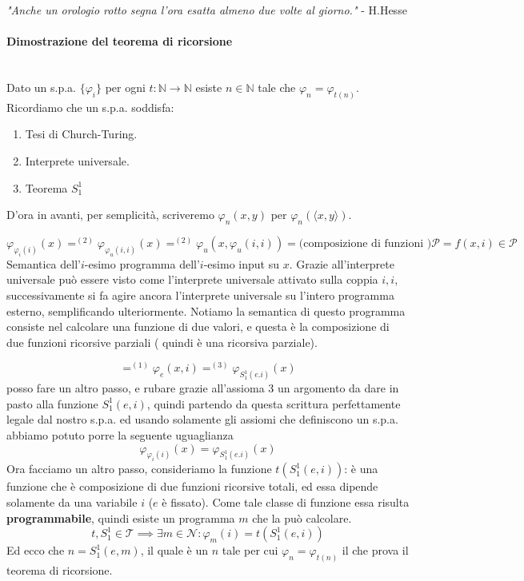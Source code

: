 \documentclass{article}
\begin{document}
\begin{center}
    \textit{"Anche un orologio rotto segna l'ora esatta almeno due volte al giorno."} - H.Hesse
\end{center}

\paragraph{Dimostrazione del teorema di ricorsione}\mbox{}\\
Dato un s.p.a. $\{\varphi_i\}$ per ogni $t:\mathbb{N}\rightarrow\mathbb{N}$ esiste
$n\in\mathbb{N}$ tale che $\varphi_n=\varphi_{t(n)}$.
Ricordiamo che un s.p.a. soddisfa:
\begin{enumerate}
    \item Tesi di Church-Turing.
    \item Interprete universale.
    \item Teorema $S_1^1$
\end{enumerate}
D'ora in avanti, per semplicità, scriveremo $\varphi_n(x,y)$ per $\varphi_n(\langle x,y\rangle)$.

$$\varphi_{\varphi_i(i)}(x)=^{(2)}\varphi_{\varphi_u (i,i)}(x)=^{(2)}\varphi_u(x,\varphi_u(i,i))=\text{(composizione di funzioni )}\mathcal{P}=f(x,i)\in\mathcal{P}$$
Semantica dell'$i$-esimo programma dell'$i$-esimo input su $x$. Grazie all'interprete
universale può essere visto come l'interprete universale attivato sulla coppia $i,i$,
successivamente si fa agire ancora l'interprete universale su l'intero programma esterno,
semplificando ulteriormente. Notiamo la semantica di questo programma consiste nel calcolare
una funzione di due valori, e questa è la composizione di due funzioni ricorsive parziali (
quindi è una ricorsiva parziale).

$$=^{(1)}\varphi_e(x,i)=^{(3)}\varphi_{S_1^1(e.i)}(x)$$
posso fare un altro passo, e rubare grazie all'assioma 3 un argomento da dare in pasto alla funzione
$S_1^1(e,i)$, quindi partendo da questa scrittura perfettamente legale dal nostro s.p.a. ed
usando solamente gli assiomi che definiscono un s.p.a. abbiamo potuto porre la seguente uguaglianza
$$\varphi_{\varphi_i(i)}(x)=\varphi_{S_1^1(e.i)}(x)$$
Ora facciamo un altro passo, consideriamo la funzione $t(S_1^1(e,i))$: è una funzione
che è composizione di due funzioni ricorsive totali, ed essa dipende solamente da una variabile
$i$ ($e$ è fissato). Come tale classe di funzione essa risulta \textbf{programmabile}, quindi
esiste un programma $m$ che la può calcolare.
$$t,S_1^1\in\mathcal{T}\implies\exists m\in\mathcal{N}:\varphi_m(i)=t(S_1^1(e,i))$$
Ed ecco che $n=S_1^1(e,m)$, il quale è un $n$ tale per cui $\varphi_n=\varphi_{t(n)}$ il
che prova il teorema di ricorsione.
\end{document}
